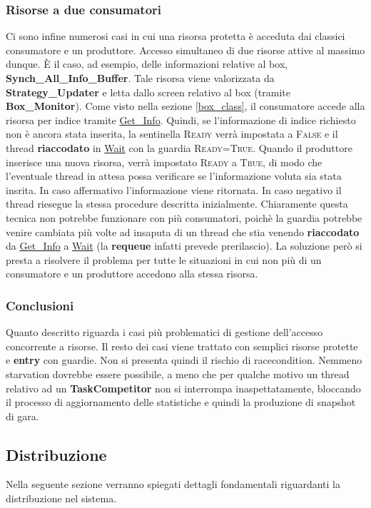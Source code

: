 \subsubsection{Risorse a due consumatori}
Ci sono infine numerosi casi in cui una risorsa protetta \`{e} acceduta dai classici consumatore e un produttore. Accesso simultaneo di due risorse attive al massimo dunque.
\`{E} il caso, ad esempio, delle informazioni relative al box, \textbf{Synch\_All\_Info\_Buffer}. Tale risorsa viene valorizzata da \textbf{Strategy\_Updater} e 
letta dallo screen relativo al box (tramite \textbf{Box\_Monitor}). Come visto nella sezione \ref{box_class}, il consumatore accede alla risorsa per indice tramite 
\underline{Get\_Info}. Quindi,
se l'informazione di indice richiesto non \`{e} ancora stata inserita, la sentinella \textsc{Ready} verr\`{a} impostata a \textsc{False} e il thread \textbf{riaccodato} in \underline{Wait}
con la guardia \textsc{Ready=True}. Quando il produttore inserisce una nuova risorsa, verr\`{a} impostato \textsc{Ready} a \textsc{True}, di modo che l'eventuale
thread in attesa possa verificare se l'informazione voluta sia stata insrita. In caso affermativo l'informazione viene ritornata. In caso negativo il thread riesegue
la stessa procedure descritta inizialmente. Chiaramente questa tecnica non potrebbe funzionare con pi\`{u} consumatori, poich\`{e} la guardia potrebbe venire cambiata
pi\`{u} volte ad insaputa di un thread che stia venendo \textbf{riaccodato} da \underline{Get\_Info} a \underline{Wait} (la \textbf{requeue} infatti prevede prerilascio). La
soluzione per\`{o} si presta a risolvere il problema per tutte le situazioni in cui non pi\`{u} di un consumatore e un produttore accedono alla stessa risorsa.
\subsubsection{Conclusioni}
Quanto descritto riguarda i casi pi\`{u} problematici di gestione dell'accesso concorrente a risorse. Il resto dei casi viene trattato con semplici risorse protette
e \textbf{entry} con guardie. Non si presenta quindi il rischio di racecondition. Nemmeno starvation dovrebbe essere possibile, 
a meno che per qualche motivo un thread relativo ad un \textbf{TaskCompetitor}
non si interrompa inaspettatamente, bloccando il processo di aggiornamento delle statistiche e quindi la produzione di snapshot di gara.
\subsection{Distribuzione}
Nella seguente sezione verranno spiegati dettagli fondamentali riguardanti la distribuzione nel sistema.
